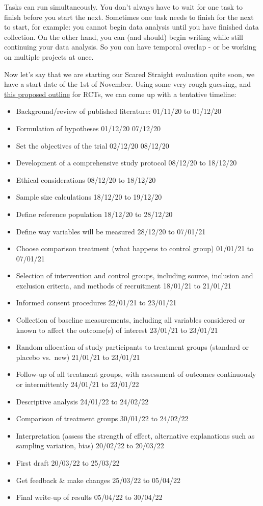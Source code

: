 \documentclass[
]{book}
\providecommand{\tightlist}{%
  \setlength{\itemsep}{0pt}\setlength{\parskip}{0pt}}
\begin{document}
Tasks can run simultaneously. You don't always have to wait for one task to finish before you start the next. Sometimes one task needs to finish for the next to start, for example: you cannot begin data analysis until you have finished data collection. On the other hand, you can (and should) begin writing while still continuing your data analysis. So you can have temporal overlap - or be working on multiple projects at once.

Now let's say that we are starting our Scared Straight evaluation quite soon, we have a start date of the 1st of November. Using some very rough guessing, and \href{https://www.healthknowledge.org.uk/e-learning/epidemiology/practitioners/introduction-study-design-is-rct}{this proposed outline} for RCTs, we can come up with a tentative timeline:

\begin{itemize}
\tightlist
\item
  Background/review of published literature: 01/11/20 to 01/12/20
\item
  Formulation of hypotheses 01/12/20 07/12/20
\item
  Set the objectives of the trial 02/12/20 08/12/20
\item
  Development of a comprehensive study protocol 08/12/20 to 18/12/20
\item
  Ethical considerations 08/12/20 to 18/12/20
\item
  Sample size calculations 18/12/20 to 19/12/20
\item
  Define reference population 18/12/20 to 28/12/20
\item
  Define way variables will be measured 28/12/20 to 07/01/21
\item
  Choose comparison treatment (what happens to control group) 01/01/21 to 07/01/21
\item
  Selection of intervention and control groups, including source, inclusion and exclusion criteria, and methods of recruitment 18/01/21 to 21/01/21
\item
  Informed consent procedures 22/01/21 to 23/01/21
\item
  Collection of baseline measurements, including all variables considered or known to affect the outcome(s) of interest 23/01/21 to 23/01/21
\item
  Random allocation of study participants to treatment groups (standard or placebo vs.~new) 21/01/21 to 23/01/21
\item
  Follow-up of all treatment groups, with assessment of outcomes continuously or intermittently 24/01/21 to 23/01/22
\item
  Descriptive analysis 24/01/22 to 24/02/22
\item
  Comparison of treatment groups 30/01/22 to 24/02/22
\item
  Interpretation (assess the strength of effect, alternative explanations such as sampling variation, bias) 20/02/22 to 20/03/22
\item
  First draft 20/03/22 to 25/03/22
\item
  Get feedback \& make changes 25/03/22 to 05/04/22
\item
  Final write-up of results 05/04/22 to 30/04/22
\end{itemize}
\end{document}
